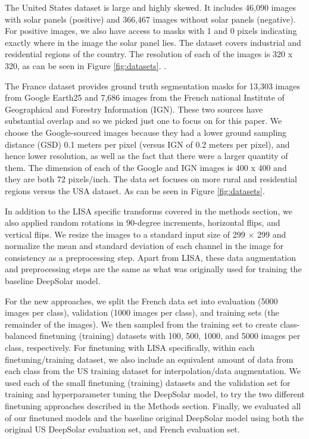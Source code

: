 \documentclass[10pt,twocolumn,letterpaper]{article}
\begin{document}
The United States dataset is large and highly skewed. It includes 46,090 images with solar panels (positive) and 366,467 images without solar panels (negative). For positive images, we also have access to masks with 1 and 0 pixels indicating exactly where in the image the solar panel lies. The dataset covers industrial and residential regions of the country. The resolution of each of the images is 320 x 320, as can be seen in Figure \ref{fig:datasets}.  \cite{DeepSolar1}. 

 The France dataset provides ground truth segmentation masks for 13,303 images from Google Earth25 and 7,686 images from the French national Institute of Geographical and Forestry Information (IGN). These two sources have substantial overlap and so we picked just one to focus on for this paper. We choose the Google-sourced images because they had a lower ground sampling distance (GSD) 0.1 meters per pixel (versus IGN of 0.2 meters per pixel), and hence lower resolution, as well as the fact that there were a larger quantity of them. The dimension of each of the Google and IGN images is 400 x 400 and they are both 72 pixels/inch.  The data set focuses on more rural and residential regions versus the USA dataset. As can be seen in Figure \ref{fig:datasets}. \cite{Kasmi2023} 
 
 In addition to the LISA specific transforms covered in the methods section, we also applied random rotations in 90-degree increments, horizontal flips, and vertical flips. We resize the images to a standard input size of 299 $\times$ 299 and normalize the mean and standard deviation of each channel in the image for consistency as a preprocessing step. Apart from LISA, these data augmentation and preprocessing steps are the same as what was originally used for training the baseline DeepSolar model. 
 
For the new approaches, we split the French data set into evaluation (5000 images per class), validation (1000 images per class), and training sets (the remainder of the images). We then sampled from the training set to create class-balanced finetuning (training) datasets with 100, 500, 1000, and 5000 images per class, respectively. For finetuning with LISA specifically, within each finetuning/training dataset, we also include an equivalent amount of data from each class from the US training dataset for interpolation/data augmentation. We used each of the small finetuning (training) datasets and the validation set for training and hyperparameter tuning the DeepSolar model, to try the two different finetuning approaches described in the Methods section. Finally, we evaluated all of our finetuned models and the baseline original DeepSolar model using both the original US DeepSolar evaluation set, and French evaluation set.
\end{document}
